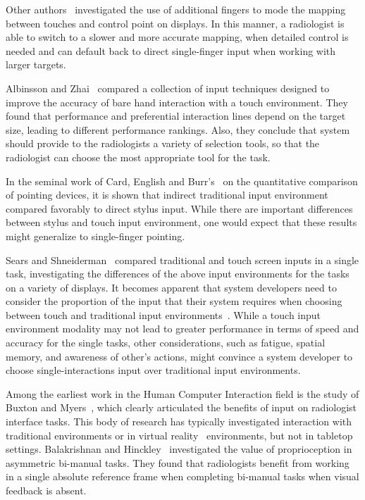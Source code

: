 \documentclass{sigchi}
\begin{document}
Other authors~\cite{benko2006precise, esenther2006fluid} investigated the use of additional fingers to mode the mapping between touches and control point on displays. In this manner, a radiologist is able to switch to a slower and more accurate mapping, when detailed control is needed and can default back to direct single-finger input when working with larger targets.

Albinsson and Zhai~\cite{albinsson2003high} compared a collection of input techniques designed to improve the accuracy of bare hand interaction with a touch environment. 
They found that performance and preferential interaction lines depend on the target size, leading to different performance rankings. Also, they conclude that system should provide to the radiologists a variety of selection tools, so that the radiologist can choose the most appropriate tool for the task.

In the seminal work of Card, English and Burr's~\cite{card1978evaluation} on the quantitative comparison of pointing devices, it is shown that indirect traditional input environment compared  favorably to direct stylus input. While there are important differences between stylus and touch input environment, one would expect that these results might generalize to single-finger pointing.

Sears and Shneiderman~\cite{sears1991high} compared traditional and touch screen inputs in a single task, investigating the differences of the above input environments for the tasks on a variety of displays. It becomes apparent that system developers need to consider the proportion of the input that their system requires when choosing between touch and traditional input environments~\cite{forlines2007direct}. While a touch input environment modality may not lead to greater performance in terms of speed and accuracy for the single tasks, other considerations, such as fatigue, spatial memory, and awareness of other’s actions, might convince a system developer to choose single-interactions input over traditional input environments.

Among the earliest work in the Human Computer Interaction field is the study of Buxton and Myers~\cite{kabbash1994two}, which clearly articulated the benefits of input on radiologist interface tasks. This body of research has typically investigated interaction with traditional environments or in virtual reality~\cite{sousa2017vrrrroom} environments, but not in tabletop settings. Balakrishnan and Hinckley~\cite{balakrishnan1999role} investigated the value of proprioception in asymmetric bi-manual tasks. They found that radiologists benefit from working in a single absolute reference frame when completing bi-manual tasks when visual feedback is absent.
\end{document}
